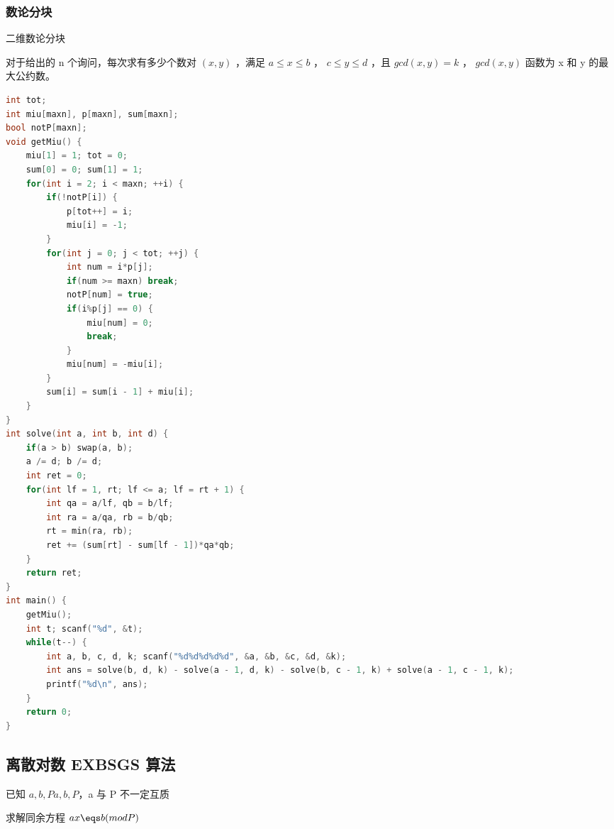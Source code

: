 \subsubsection{数论分块}

二维数论分块

对于给出的 n 个询问，每次求有多少个数对 $(x, y)$ ，满足 $a \le x \le b$ ， $c \le y \le d$ ，且 $gcd(x, y) = k$ ， $gcd(x, y)$ 函数为 x 和 y 的最大公约数。

\begin{lstlisting}[language=C++]
int tot;
int miu[maxn], p[maxn], sum[maxn];
bool notP[maxn];
void getMiu() {
    miu[1] = 1; tot = 0;
    sum[0] = 0; sum[1] = 1;
    for(int i = 2; i < maxn; ++i) {
        if(!notP[i]) {
            p[tot++] = i;
            miu[i] = -1;
        }
        for(int j = 0; j < tot; ++j) {
            int num = i*p[j];
            if(num >= maxn) break;
            notP[num] = true;
            if(i%p[j] == 0) {
                miu[num] = 0;
                break;
            }
            miu[num] = -miu[i];
        }
        sum[i] = sum[i - 1] + miu[i];
    }
}
int solve(int a, int b, int d) {
    if(a > b) swap(a, b);
    a /= d; b /= d;
    int ret = 0;
    for(int lf = 1, rt; lf <= a; lf = rt + 1) {
        int qa = a/lf, qb = b/lf;
        int ra = a/qa, rb = b/qb;
        rt = min(ra, rb);
        ret += (sum[rt] - sum[lf - 1])*qa*qb;
    }
    return ret;
}
int main() {
    getMiu();
    int t; scanf("%d", &t);
    while(t--) {
        int a, b, c, d, k; scanf("%d%d%d%d%d", &a, &b, &c, &d, &k);
        int ans = solve(b, d, k) - solve(a - 1, d, k) - solve(b, c - 1, k) + solve(a - 1, c - 1, k);
        printf("%d\n", ans);
    }
    return 0;
}
\end{lstlisting}

\subsection{离散对数 EXBSGS 算法}

已知 $a, b, Pa, b, P$，a 与 P 不一定互质

求解同余方程 $ax \eqs b (mod P)$

